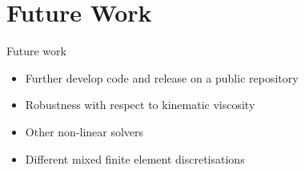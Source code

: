 \documentclass[12pt]{beamer}
\newcommand{\re}[1]{{\textcolor{red}       {#1}}}
\renewcommand{\div}{\nabla\cdot\,}
\begin{document}






\section{Future Work}
\begin{frame}{Future work}

\begin{itemize}
\item Further develop code and release on a public repository
\item Robustness with respect to kinematic viscosity
\item Other non-linear solvers
\item Different mixed finite element discretisations
\end{itemize}
\end{frame}
\end{document}
